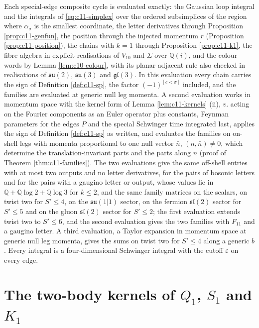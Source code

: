 \begin{remark}
\label{rem:c11-method}
Each special-edge composite cycle is evaluated exactly: the Gaussian loop integral and the integrals of \eqref{eq:c11-simplex} over the ordered subsimplices of the region where $\alpha_\sigma$ is the smallest coordinate, the letter derivatives through Proposition \ref{prop:c11-genfun}, the position through the injected momentum $r$ (Proposition \ref{prop:c11-position}), the chains with $k=1$ through Proposition \ref{prop:c11-k1}, the fibre algebra in explicit realisations of $V_{10}$ and $\Sigma$ over $\mathbb Q(i)$, and the colour words by Lemma \ref{lem:c10-colour}, with its planar adjacent rule also checked in realisations of $\mathfrak{su}(2)$, $\mathfrak{su}(3)$ and $\mathfrak{gl}(3)$. In this evaluation every chain carries the sign of Definition \ref{def:c11-sp}, the factor $(-1)^{[c<\sigma]}$ included, and the families are evaluated at generic null leg momenta. A second evaluation works in momentum space with the kernel form of Lemma \ref{lem:c11-kernels} (ii), $v.$ acting on the Fourier components as an Euler operator plus constants, Feynman parameters for the edges $P$ and the special Schwinger time integrated last, applies the sign of Definition \ref{def:c11-sp} as written, and evaluates the families on on-shell legs with momenta proportional to one null vector $\bar n$, $(n,\bar n)\neq0$, which determine the translation-invariant parts and the parts along $n$ (proof of Theorem \ref{thm:c11-families}). The two evaluations give the same off-shell entries with at most two outputs and no letter derivatives, for the pairs of bosonic letters and for the pairs with a gaugino letter or output, whose values lie in $\mathbb Q+\mathbb Q\log2+\mathbb Q\log3$ for $k\le2$, and the same family matrices on the scalars, on twist two for $S'\le4$, on the $\mathfrak{su}(1|1)$ sector, on the fermion $\mathfrak{sl}(2)$ sector for $S'\le5$ and on the gluon $\mathfrak{sl}(2)$ sector for $S'\le2$; the first evaluation extends twist two to $S'\le6$, and the second evaluation gives the two families with $F_{11}$ and a gaugino letter. A third evaluation, a Taylor expansion in momentum space at generic null leg momenta, gives the sums on twist two for $S'\le4$ along a generic $b$. Every integral is a four-dimensional Schwinger integral with the cutoff $\varepsilon$ on every edge.
\end{remark}

\section{The two-body kernels of $Q_1$, $S_1$ and $K_1$}

